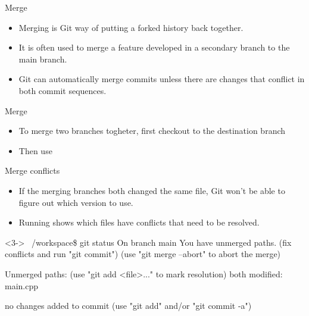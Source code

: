 \begin{frame}[fragile]{Merge}
\begin{itemize}[<+->]
    \item Merging is Git way of putting a forked history back together.
    \item It is often used to merge a feature developed in a secondary branch to the main branch.
    \item Git can automatically merge commits unless there are changes that conflict in both commit sequences.
\end{itemize}
\end{frame}

\begin{frame}[fragile]{Merge \insertcontinuationtext}
    \begin{itemize}[<+->]
        \item To merge two branches togheter, first checkout to the destination branch
        \item Then use 
    \end{itemize}
\end{frame}

\begin{frame}[fragile]{Merge conflicts}
    \begin{itemize}[<+->]
        \item If the merging branches both changed the same file, Git won't be able to figure out which version to use.
        \item Running  shows which files have conflicts that need to be resolved.
    \end{itemize}
    \begin{shellblock}<3->
~/workspace\$ git status \inserthitenter
On branch main
You have unmerged paths.
  (fix conflicts and run "git commit")
  (use "git merge --abort" to abort the merge)

Unmerged paths:
  (use "git add <file>..." to mark resolution)
        both modified:   main.cpp

no changes added to commit (use "git add" and/or "git commit -a")    
    \end{shellblock}
\end{frame}


